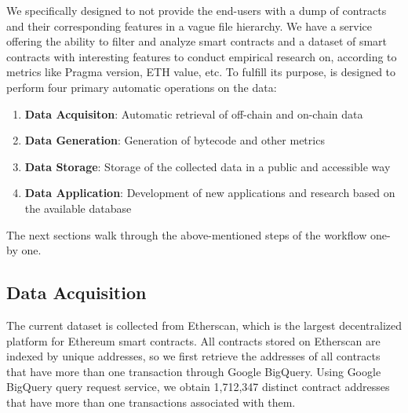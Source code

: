 	We specifically designed \etherbase to not provide the end-users with a dump of contracts and their corresponding features in a vague file hierarchy.
	We have a service offering the ability to filter and analyze smart contracts and a dataset of smart contracts with interesting features to conduct empirical research on, according to metrics like Pragma version, ETH value, etc.
	To fulfill its purpose, \etherbase is designed to perform four primary automatic operations on the data:
	\begin{enumerate}
		\item \textbf{Data Acquisiton}: Automatic retrieval of off-chain and on-chain data
		\item \textbf{Data Generation}: Generation of bytecode and other metrics
		\item \textbf{Data Storage}: Storage of the collected data in a public and accessible way
		\item \textbf{Data Application}: Development of new applications and research based on the available database
	\end{enumerate}

	The next sections walk through the above-mentioned steps of the workflow one-by one.

	\subsection{Data Acquisition}
		The current dataset is collected from Etherscan, which is the largest decentralized platform for Ethereum smart contracts.
		All contracts stored on Etherscan are indexed by unique addresses, so we first retrieve the addresses of all contracts that have more than one transaction through Google BigQuery.
		Using Google BigQuery query request service, we obtain 1,712,347 distinct contract addresses that have more than one transactions associated with them.

